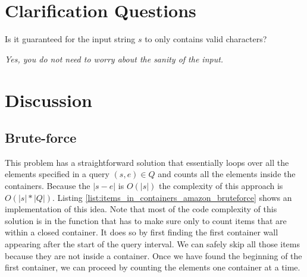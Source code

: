 \section{Clarification Questions}

\begin{QandA}
	\begin{questionitem} \begin{question} Is it guaranteed for the input string $s$ to only contains valid characters?  \end{question} 	 
    \begin{answered}
		\textit{Yes, you do not need to worry about the sanity of the input.}
	\end{answered} \end{questionitem}
\end{QandA}

\section{Discussion}
\label{items_in_containers_amazon:sec:discussion}



\subsection{Brute-force}
\label{items_in_containers_amazon:sec:bruteforce}
This problem has a straightforward solution that essentially loops over all the elements  specified in
a query $(s,e) \in Q$ and counts all the elements inside the containers. Because the $|s-e|$ is
$O(|s|)$ the complexity of this approach is $O(|s|*|Q|)$. Listing
\ref{list:items_in_containers_amazon_bruteforce} shows an implementation of this idea. Note that
most of the code complexity of this solution is in the  function
that has to make sure only to count items that are within a closed container. It does so by first
finding the first container wall appearing after the start of the query interval. We can safely skip
all those items because they are not inside a container. Once we have found the beginning of the
first container, we can proceed by counting the elements one container at a time. 



